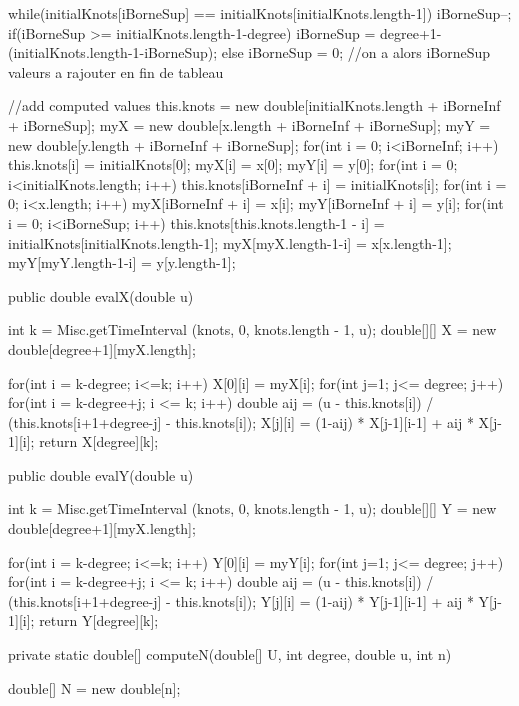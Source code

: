 \begin{code}
\begin{hide}
{{         while(initialKnots[iBorneSup] == initialKnots[initialKnots.length-1])
            iBorneSup--;
         if(iBorneSup >= initialKnots.length-1-degree)
            iBorneSup = degree+1-(initialKnots.length-1-iBorneSup);
         else
            iBorneSup = 0; //on a alors iBorneSup valeurs a rajouter en fin de tableau

         //add computed values
         this.knots = new double[initialKnots.length + iBorneInf + iBorneSup];
         myX = new double[x.length + iBorneInf + iBorneSup];
         myY = new double[y.length + iBorneInf + iBorneSup];
         for(int i = 0; i<iBorneInf; i++) {
            this.knots[i] = initialKnots[0];
            myX[i] = x[0];
            myY[i] = y[0];
         }
         for(int i = 0; i<initialKnots.length; i++)
            this.knots[iBorneInf + i] = initialKnots[i];
         for(int i = 0; i<x.length; i++) {
            myX[iBorneInf + i] = x[i];
            myY[iBorneInf + i] = y[i];
         }
         for(int i = 0; i<iBorneSup; i++) {
            this.knots[this.knots.length-1 - i] = initialKnots[initialKnots.length-1];
            myX[myX.length-1-i] = x[x.length-1];
            myY[myY.length-1-i] = y[y.length-1];
         }
      }
   }

   public double evalX(double u) {
      int k = Misc.getTimeInterval (knots, 0, knots.length - 1, u);
      double[][] X = new double[degree+1][myX.length];

      for(int i = k-degree; i<=k; i++)
         X[0][i] = myX[i];
      for(int j=1; j<= degree; j++) {
         for(int i = k-degree+j; i <= k; i++) {
            double aij = (u - this.knots[i]) / (this.knots[i+1+degree-j] - this.knots[i]);
            X[j][i] = (1-aij) * X[j-1][i-1] + aij * X[j-1][i];
         }
      }
      return X[degree][k];
   }

   public double evalY(double u) {
      int k = Misc.getTimeInterval (knots, 0, knots.length - 1, u);
      double[][] Y = new double[degree+1][myX.length];

      for(int i = k-degree; i<=k; i++)
         Y[0][i] = myY[i];
      for(int j=1; j<= degree; j++) {
         for(int i = k-degree+j; i <= k; i++) {
            double aij = (u - this.knots[i]) / (this.knots[i+1+degree-j] - this.knots[i]);
            Y[j][i] = (1-aij) * Y[j-1][i-1] + aij * Y[j-1][i];
         }
      }
      return Y[degree][k];
   }

   private static double[] computeN(double[] U, int degree, double u, int n) {
      double[] N = new double[n];

}
\end{hide}
\end{code}
